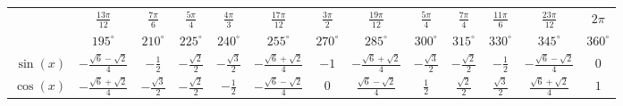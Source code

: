 \documentclass[10pt,a4paper]{article}
\begin{document}
\begin{center}
	\begin{tabular}{r|c|c|c|c|c|c|c|c|c|c|c|c}
		  & $\frac{13\pi}{12}$ & $\frac{7\pi}{6}$ & $\frac{5\pi}{4}$ & $\frac{4\pi}{3}$ & $\frac{17\pi}{12}$ & $\frac{3\pi}{2}$ & $\frac{19\pi}{12}$ & $\frac{5\pi}{4}$ & $\frac{7\pi}{4}$ & $\frac{11\pi}{6}$ & $\frac{23\pi}{12}$ & $2\pi$ \\ \cline{2-13}	&$195^\circ$&$210^\circ$&$225^\circ$&$240^\circ$&$255^\circ$&$270^\circ$&$285^\circ$&$300^\circ$&$315^\circ$&$330^\circ$&$345^\circ$&$360^\circ$\\\hline
		$\sin(x)$&$-\frac{\sqrt{6}-\sqrt{2}}{4}$&$-\frac{1}{2}$&$-\frac{\sqrt{2}}{2}$&$-\frac{\sqrt{3}}{2}$&$-\frac{\sqrt{6}+\sqrt{2}}{4}$&$-1$&$-\frac{\sqrt{6}+\sqrt{2}}{4}$&$-\frac{\sqrt{3}}{2}$&$-\frac{\sqrt{2}}{2}$&$-\frac{1}{2}$&$-\frac{\sqrt{6}-\sqrt{2}}{4}$&$0$\\\hline
		$\cos(x)$&$-\frac{\sqrt{6}+\sqrt{2}}{4}$&$-\frac{\sqrt{3}}{2}$&$-\frac{\sqrt{2}}{2}$&$-\frac{1}{2}$&$-\frac{\sqrt{6}-\sqrt{2}}{4}$&$0$&$\frac{\sqrt{6}-\sqrt{2}}{4}$&$\frac{1}{2}$&$\frac{\sqrt{2}}{2}$&$\frac{\sqrt{3}}{2}$&$\frac{\sqrt{6}+\sqrt{2}}{4}$&$1$\\\hline	
	\end{tabular}
\end{center}
\end{document}
